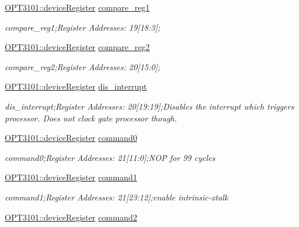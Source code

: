 \begin{DoxyCompactItemize}
\mbox{\hyperlink{class_o_p_t3101_1_1device_register}{O\+P\+T3101\+::device\+Register}} \mbox{\hyperlink{class_o_p_t3101_1_1registers_a66b3c106a182638bcba57fce98249057}{compare\+\_\+reg1}}
\begin{DoxyCompactList}\small\item\em compare\+\_\+reg1;Register Addresses\+: 19\mbox{[}18\+:3\mbox{]}; \end{DoxyCompactList}\item 
\mbox{\hyperlink{class_o_p_t3101_1_1device_register}{O\+P\+T3101\+::device\+Register}} \mbox{\hyperlink{class_o_p_t3101_1_1registers_ad0464b8aa844fc67e319b0d41a599d92}{compare\+\_\+reg2}}
\begin{DoxyCompactList}\small\item\em compare\+\_\+reg2;Register Addresses\+: 20\mbox{[}15\+:0\mbox{]}; \end{DoxyCompactList}\item 
\mbox{\hyperlink{class_o_p_t3101_1_1device_register}{O\+P\+T3101\+::device\+Register}} \mbox{\hyperlink{class_o_p_t3101_1_1registers_a2db3e8eb7993d00d2969311c9407e4f0}{dis\+\_\+interrupt}}
\begin{DoxyCompactList}\small\item\em dis\+\_\+interrupt;Register Addresses\+: 20\mbox{[}19\+:19\mbox{]};Disables the interrupt which triggers processor. Does not clock gate processor though. \end{DoxyCompactList}\item 
\mbox{\hyperlink{class_o_p_t3101_1_1device_register}{O\+P\+T3101\+::device\+Register}} \mbox{\hyperlink{class_o_p_t3101_1_1registers_a8f0a2183e0efe165980fcf47ffeeec76}{command0}}
\begin{DoxyCompactList}\small\item\em command0;Register Addresses\+: 21\mbox{[}11\+:0\mbox{]};N\+OP for 99 cycles \end{DoxyCompactList}\item 
\mbox{\hyperlink{class_o_p_t3101_1_1device_register}{O\+P\+T3101\+::device\+Register}} \mbox{\hyperlink{class_o_p_t3101_1_1registers_ab467fd102aeb9c253099fcc2dadf1b50}{command1}}
\begin{DoxyCompactList}\small\item\em command1;Register Addresses\+: 21\mbox{[}23\+:12\mbox{]};enable intrinsic-\/xtalk \end{DoxyCompactList}\item 
\mbox{\hyperlink{class_o_p_t3101_1_1device_register}{O\+P\+T3101\+::device\+Register}} \mbox{\hyperlink{class_o_p_t3101_1_1registers_aed26bc378310752c75ab2a494d349a7e}{command2}}

\end{DoxyCompactItemize}
